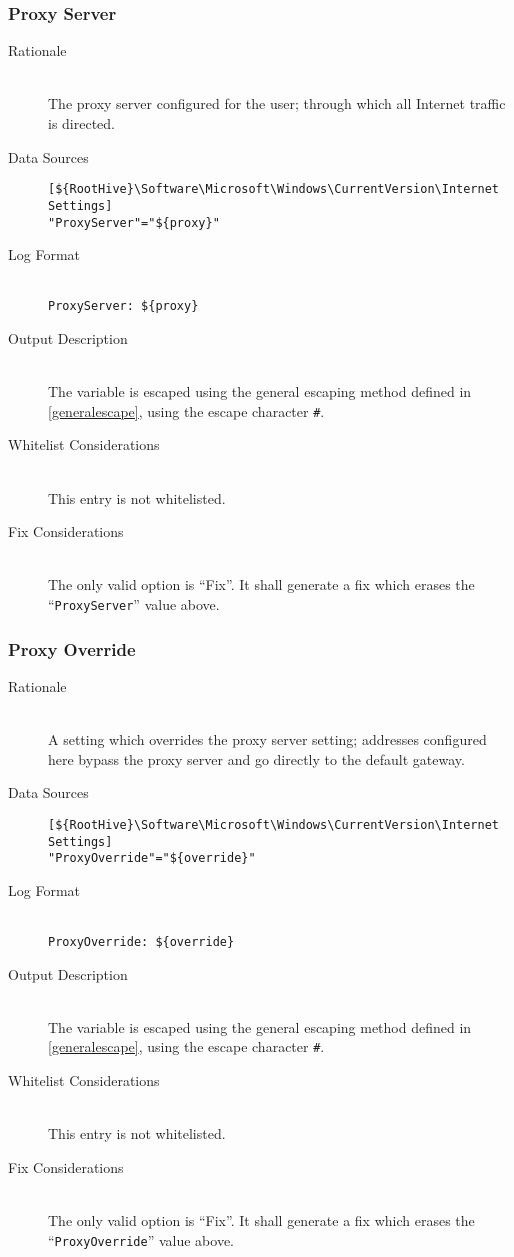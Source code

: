 \subsubsection{Proxy Server}
\begin{description}
\item[Rationale] \hfill \\
The proxy server configured for the user; through which all Internet traffic is
directed.
\item[Data Sources] \hfill
\vspace{-\baselineskip}
\begin{verbatim}
[${RootHive}\Software\Microsoft\Windows\CurrentVersion\Internet Settings]
"ProxyServer"="${proxy}"
\end{verbatim}
\item[Log Format] \hfill \\
\verb|ProxyServer: ${proxy}|
\item[Output Description] \hfill \\
The variable  is escaped using the general escaping method defined in
\ref{generalescape}, using the escape character \verb|#|.
\item[Whitelist Considerations] \hfill \\
This entry is not whitelisted.
\item[Fix Considerations] \hfill \\
The only valid option is ``Fix''. It shall generate a fix which erases the
``\verb|ProxyServer|'' value above.
\end{description}

\subsubsection{Proxy Override}
\begin{description}
\item[Rationale] \hfill \\
A setting which overrides the proxy server setting; addresses configured here
bypass the proxy server and go directly to the default gateway.
\item[Data Sources] \hfill
\vspace{-\baselineskip}
\begin{verbatim}
[${RootHive}\Software\Microsoft\Windows\CurrentVersion\Internet Settings]
"ProxyOverride"="${override}"
\end{verbatim}
\item[Log Format] \hfill \\
\verb|ProxyOverride: ${override}|
\item[Output Description] \hfill \\
The variable  is escaped using the general escaping method defined
in \ref{generalescape}, using the escape character \verb|#|.
\item[Whitelist Considerations] \hfill \\
This entry is not whitelisted.
\item[Fix Considerations] \hfill \\
The only valid option is ``Fix''. It shall generate a fix which erases the
``\verb|ProxyOverride|'' value above.
\end{description}

